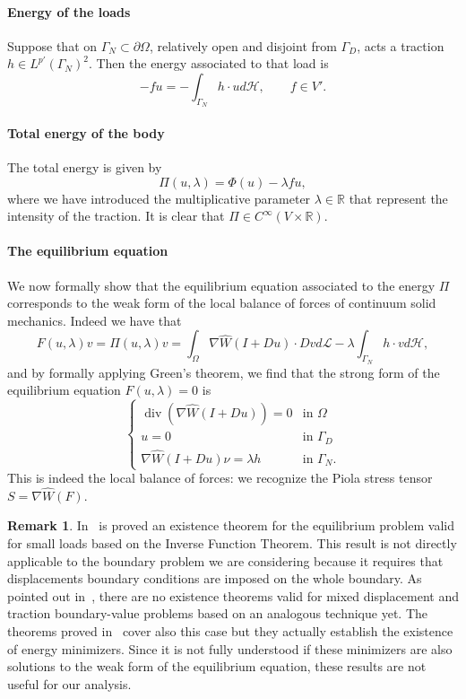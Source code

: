 \documentclass[a4paper,11pt]{article}
\theoremstyle{definition}
\newtheorem{rmk}[prop]{Remark}
\DeclareMathOperator{\diver}{div}
\begin{document}
\paragraph{Energy of the loads} Suppose that on $\Gamma_N\subset\partial\Omega$, relatively open and disjoint from $\Gamma_D$, acts a traction $h\in L^{p'}(\Gamma_N)^2$. Then the energy associated to that load is
\[
-fu=-\int_{\Gamma_N}h\cdot ud\mathscr{H},\qquad\text{$f\in V'$}.
\]

\paragraph{Total energy of the body} The total energy is given by
\[
\Pi(u,\lambda)=\Phi(u)-\lambda fu,
\]
where we have introduced the multiplicative parameter $\lambda\in\mathbb{R}$ that represent the intensity of the traction. It is clear that $\Pi\in C^\infty(V\times\mathbb{R})$.

\paragraph{The equilibrium equation} We now formally show that the equilibrium equation associated to the energy $\Pi$ corresponds to the weak form of the local balance of forces of continuum solid mechanics. Indeed we have that
\[
F(u,\lambda)v=\Pi(u,\lambda)v=\int_\Omega \nabla\hat{W}(I+Du)\cdot Dvd\mathscr{L}-\lambda\int_{\Gamma_N}h\cdot vd\mathscr{H},
\]
and by formally applying Green's theorem, we find that the strong form of the equilibrium equation $F(u,\lambda)=0$ is
\[
\begin{cases}
\diver(\nabla \hat W(I+Du))=0 & \text{in $\Omega$} \\
u=0 & \text{in $\Gamma_D$} \\
\nabla \hat W(I+Du)\nu=\lambda h & \text{in $\Gamma_N$}.
\end{cases}
\]
This is indeed the local balance of forces: we recognize the Piola stress tensor $S=\nabla \hat{W}(F)$.

\begin{rmk}
\label{rmk:open-problems}
In~\cite{ciarlet} is proved an existence theorem for the equilibrium problem valid for small loads based on the Inverse Function Theorem. This result is not directly applicable to the boundary problem we are considering because it requires that displacements boundary conditions are imposed on the whole boundary. As pointed out in~\cite{open-problems}, there are no existence theorems valid for mixed displacement and traction boundary-value problems based on an analogous technique yet. The theorems proved in~\cite{ball-convexity} cover also this case but they actually establish the existence of energy minimizers. Since it is not fully understood if these minimizers are also solutions to the weak form of the equilibrium equation, these results are not useful for our analysis.
\end{rmk}
\end{document}
